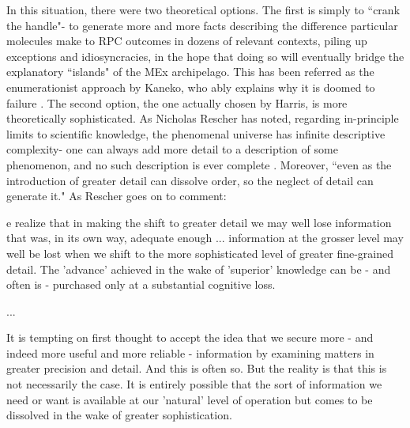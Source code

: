 In this situation, there were two theoretical options. The first is simply to ``crank the handle"- to generate more and more facts describing the difference particular molecules make to RPC outcomes in dozens of relevant contexts, piling up exceptions and idiosyncracies, in the hope that doing so will eventually bridge the explanatory ``islands" of the MEx archipelago. This has been referred as the enumerationist approach by Kaneko, who ably explains why it is doomed to failure \cite[pp.31-32]{Kaneko2006}. The second option, the one actually chosen by Harris, is more theoretically sophisticated. As Nicholas Rescher has noted, regarding in-principle limits to scientific knowledge, the phenomenal universe has infinite descriptive complexity- one can always add more detail to a description of some phenomenon, and no such description is ever complete \cite[p.22-9]{Rescher2000}. Moreover, ``even as the introduction of greater detail can dissolve order, so the neglect of detail can generate it." \cite[p.62]{Rescher2000} As Rescher goes on to comment:

\begin{longquote}
[W]e realize that in making the shift to greater detail we may well lose information that was, in its own way, adequate enough ... information at the grosser level may well be lost when we shift to the more sophisticated level of greater fine-grained detail. The 'advance' achieved in the wake of 'superior' knowledge can be - and often is - purchased only at a substantial cognitive loss.

...

It is tempting on first thought to accept the idea that we secure more - and indeed more useful and more reliable - information by examining matters in greater precision and detail. And this is often so. But the reality is that this is not necessarily the case. It is entirely possible that the sort of information we need or want is available at our 'natural' level of operation but comes to be dissolved in the wake of greater sophistication.
\cite[p.65-6]{Rescher2000}
\end{longquote}

